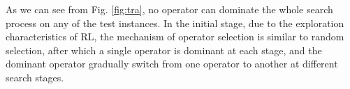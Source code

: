 \documentclass[journal]{IEEEtran}
\begin{document}
As we can see from Fig. \ref{fig:tra}, no operator can dominate the whole search process on any of the test instances. In the initial stage, due to the exploration characteristics of RL, the mechanism of operator selection is similar to random selection, after which a single operator is dominant at each stage, and the dominant operator gradually switch from one operator to another at different search stages.


\begin{figure}[t]
  \centering
  \hfil
  \hfil
  \hfil
  \hfil

\end{figure}
\end{document}
